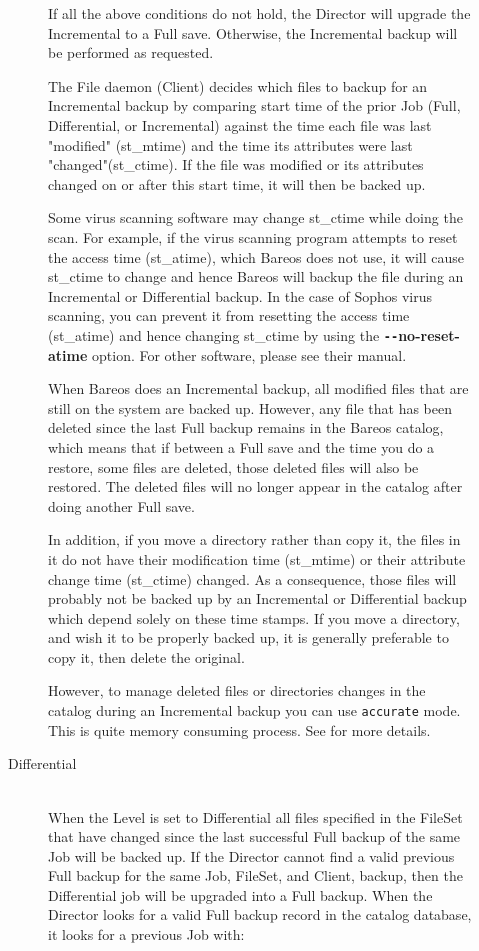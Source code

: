 \begin{description}
\begin{description}
If all the above conditions do not hold, the Director will upgrade  the
Incremental to a Full save. Otherwise, the Incremental  backup will be
performed as requested.

The File daemon (Client) decides which files to backup for an
Incremental backup by comparing start time of the prior Job (Full,
Differential, or Incremental) against the time each file was last
"modified" (st\_mtime) and the time its attributes were last
"changed"(st\_ctime).  If the file was modified or its attributes
changed on or after this start time, it will then be backed up.

Some virus scanning software may change st\_ctime while
doing the scan.  For example, if the virus scanning program attempts to
reset the access time (st\_atime), which Bareos does not use, it will
cause st\_ctime to change and hence Bareos will backup the file during
an Incremental or Differential backup.  In the case of Sophos virus
scanning, you can prevent it from resetting the access time (st\_atime)
and hence changing st\_ctime by using the {\bf \verb:--:no-reset-atime}
option.  For other software, please see their manual.

When Bareos does an Incremental backup, all modified files that are
still on the system are backed up.  However, any file that has been
deleted since the last Full backup remains in the Bareos catalog,
which means that if between a Full save and the time you do a
restore, some files are deleted, those deleted files will also be
restored.  The deleted files will no longer appear in the catalog
after doing another Full save.

In addition, if you move a directory rather than copy it, the files in
it do not have their modification time (st\_mtime) or their attribute
change time (st\_ctime) changed.  As a consequence, those files will
probably not be backed up by an Incremental or Differential backup which
depend solely on these time stamps.  If you move a directory, and wish
it to be properly backed up, it is generally preferable to copy it, then
delete the original.

However, to manage deleted files or directories changes in the
catalog during an Incremental backup you can use \texttt{accurate}
mode. This is quite memory consuming process. 
See  for more details.

\item [Differential] \hfill \\
When the Level is set to Differential
all files specified in the FileSet that have changed since the last
successful Full backup of the same Job will be backed up.
If the Director cannot find a
valid previous Full backup for the same Job, FileSet, and Client,
backup, then the Differential job will be upgraded into a Full backup.
When the Director looks for a valid Full backup record in the catalog
database, it looks for a previous Job with:


\end{description}
\end{description}
